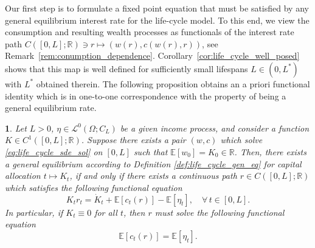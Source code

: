 \documentclass[11pt,oneside,english,reqno,dvipsnames,table]{amsart}
\numberwithin{equation}{section}
\theoremstyle{plain}
\theoremstyle{definition}
\theoremstyle{remark}
\newtheorem{rem}[thm]{\protect\remarkname}
\theoremstyle{plain}
\theoremstyle{plain}
\newtheorem{prop}[thm]{\protect\propositionname}
\theoremstyle{plain}
\theoremstyle{plain}
\theoremstyle{plain}
\theoremstyle{plain}
\theoremstyle{plain}
\providecommand{\propositionname}{Proposition}
\providecommand{\remarkname}{Remark}
\providecommand{\remarkname}{Remark}
\newcommand{\EE}{\mathbb{E}}
\newcommand{\RR}{\mathbb{R}}
\newcommand{\mbE}{\mathbb{E}}
\newcommand{\mbR}{\mathbb{R}}
\newcommand{\msL}{\mathscr{L}}
\numberwithin{thm}{section}
\begin{document}
Our first step is to formulate a fixed point equation that must be satisfied by any general equilibrium interest rate for the life-cycle model. To this end, we view the consumption and resulting wealth processes as functionals of the interest rate path $C([0,L];\mbR)\ni r \mapsto (w(r),c(w(r),r))$, see Remark~\ref{rem:conumption_dependence}. Corollary~\ref{cor:life_cycle_well_posed} shows that this map is well defined for sufficiently small lifespans $L\in (0,L^*)$ with $L^*$ obtained therein.  The following proposition obtains an a priori functional identity which is in one-to-one correspondence with the property of being a general equilibrium rate. %


%


\begin{prop}\label{prop:life_cycle_rate_props}
 Let $L>0$, $\eta \in \msL^0(\Omega;C_L)$ be a given income process, and consider a function $K\in C^1([0,L];\RR)$. Suppose there exists a pair $(w,c)$ which solve  \eqref{eq:life_cycle_sde_sol} on $[0,L]$ such that $\mbE[w_0]=K_0 \in \mbR$.  
Then, there exists a general equilibrium according to Definition \ref{def:life_cycle_gen_eq} for capital allocation $t\mapsto K_t$, if and only if there exists a continuous path $r\in C([0,L];\RR)$ which satisfies  the following functional equation
    \begin{equation}\label{eq:interest_rate}
        K_t r_t = \dot{K}_t+  \EE[c_t(r)]- \EE[\eta_t] ,\quad \forall \,t \in [0,L].
    \end{equation}
   In particular, if $K_t\equiv 0$ for all $t$, then $r$ must solve the following functional equation
    \[
    \mbE[c_t(r)] = \mbE[\eta_t].  
    \]
\end{prop}
%
\end{document}
